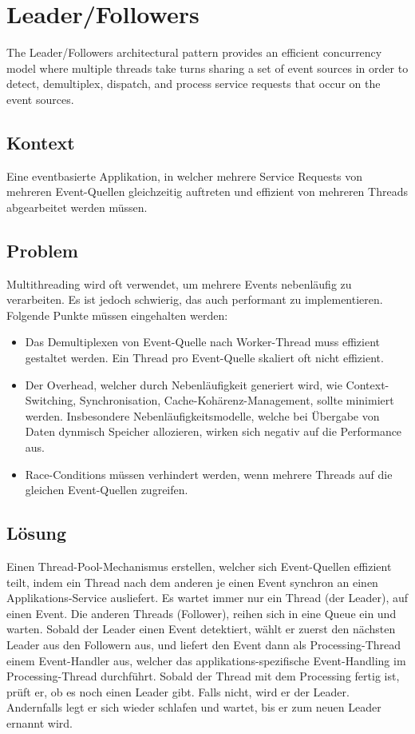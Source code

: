 \section{Leader/Followers}

The Leader/Followers architectural pattern provides an efficient concurrency model where multiple threads take turns sharing a set of event sources in order to detect, demultiplex, dispatch, and process service requests that occur on the event sources.

\subsection*{Kontext}

Eine eventbasierte Applikation, in welcher mehrere Service Requests von mehreren Event-Quellen gleichzeitig auftreten und effizient von mehreren Threads abgearbeitet werden müssen.

\subsection*{Problem}

Multithreading wird oft verwendet, um mehrere Events nebenläufig zu verarbeiten. Es ist jedoch schwierig, das auch performant zu implementieren.
Folgende Punkte müssen eingehalten werden:
\begin{itemize}
	\item Das Demultiplexen von Event-Quelle nach Worker-Thread muss effizient gestaltet werden. Ein Thread pro Event-Quelle skaliert oft nicht effizient.
	\item Der Overhead, welcher durch Nebenläufigkeit generiert wird, wie Context-Switching, Synchronisation, Cache-Kohärenz-Management, sollte minimiert werden. Insbesondere Nebenläufigkeitsmodelle, welche bei Übergabe von Daten dynmisch Speicher allozieren, wirken sich negativ auf die Performance aus.
	\item Race-Conditions müssen verhindert werden, wenn mehrere Threads auf die gleichen Event-Quellen zugreifen.
\end{itemize}

\subsection*{Lösung}

Einen Thread-Pool-Mechanismus erstellen, welcher sich Event-Quellen effizient teilt, indem ein Thread nach dem anderen je einen Event synchron an einen Applikations-Service ausliefert. Es wartet immer nur ein Thread (der Leader), auf einen Event. Die anderen Threads (Follower), reihen sich in eine Queue ein und warten. Sobald der Leader einen Event detektiert, wählt er zuerst den nächsten Leader aus den Followern aus, und liefert den Event dann als Processing-Thread einem Event-Handler aus, welcher das applikations-spezifische Event-Handling im Processing-Thread durchführt. Sobald der Thread mit dem Processing fertig ist, prüft er, ob es noch einen Leader gibt. Falls nicht, wird er der Leader. Andernfalls legt er sich wieder schlafen und wartet, bis er zum neuen Leader ernannt wird.


